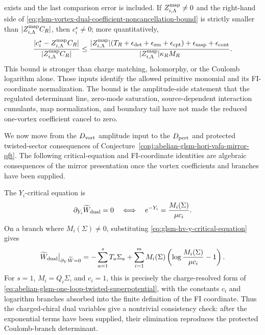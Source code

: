 \begin{controlledapproximation}
exists and the last comparison error is included.  If
\(Z^{\rm map}_{i,\Lambda}\neq0\) and the right-hand side of
\eqref{eq:glsm-vortex-dual-coefficient-noncancellation-bound} is strictly
smaller than \(|Z^{\rm map}_{i,\Lambda}C_R|\), then \(c_i^\star\neq0\); more
quantitatively,
\[
  \frac{|c_i^\star-Z^{\rm map}_{i,\Lambda}C_R|}
       {|Z^{\rm map}_{i,\Lambda}C_R|}
  \le
  \frac{
    |Z^{\rm map}_{i,\Lambda}|
    (T_R+\epsilon_{\rm det}+\epsilon_{\rm zm}+\epsilon_{\rm cpt})
    +\epsilon_{\rm map}+\epsilon_{\rm cont}
  }{|Z^{\rm map}_{i,\Lambda}|\kappa_R M_R}.
\]
This bound is stronger than charge matching, holomorphy, or the
Coulomb logarithm alone.  Those inputs identify the allowed primitive
monomial and its FI-coordinate normalization.  The bound is the
amplitude-side statement that the regulated determinant line, zero-mode
saturation, source-dependent interaction cumulants, map normalization, and
boundary tail have not made the reduced one-vortex coefficient cancel to zero.
\end{controlledapproximation}

We now move from the \(D_{\rm vort}\) amplitude input to the \(D_{\rm pert}\)
and protected twisted-sector consequences of
Conjecture~\ref{conj:abelian-glsm-hori-vafa-mirror-qft}.  The following
critical-equation and FI-coordinate identities are algebraic consequences of
the mirror presentation once the vortex coefficients and branches have been
supplied.

The \(Y_i\)-critical equation is
\begin{equation}
  \partial_{Y_i}\widetilde W_{\rm dual}=0
  \quad\Longleftrightarrow\quad
  e^{-Y_i}=\frac{M_i(\Sigma)}{\mu c_i}.
  \label{eq:glsm-hv-y-critical-equation}
\end{equation}
On a branch where \(M_i(\Sigma)\neq0\), substituting
\eqref{eq:glsm-hv-y-critical-equation} gives
\begin{equation}
  \widetilde W_{\rm dual}\big|_{\partial_Y\widetilde W=0}
  =
  -\sum_{a=1}^s T_a\Sigma_a
  +
  \sum_{i=1}^m
  M_i(\Sigma)
  \left(
    \log\frac{M_i(\Sigma)}{\mu c_i}-1
  \right).
  \label{eq:glsm-hv-eliminated-one-loop-superpotential}
\end{equation}
For \(s=1\), \(M_i=Q_i\Sigma\), and \(c_i=1\), this is precisely the
charge-resolved form of
\eqref{eq:abelian-glsm-one-loop-twisted-superpotential}, with the constants
\(c_i\) and logarithm branches absorbed into the finite definition of the
FI coordinate.  Thus the charged-chiral dual variables give a nontrivial
consistency check: after the exponential terms have been supplied, their
elimination reproduces the protected Coulomb-branch determinant.

